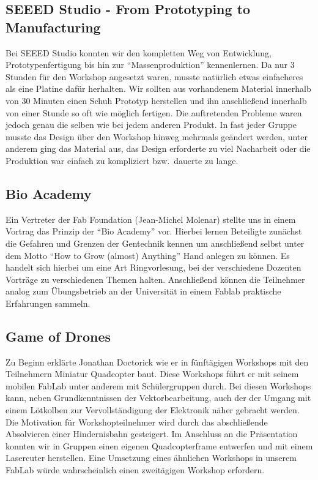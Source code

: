 \documentclass{\basedir/fablab-document}
\begin{document}
\subsection*{SEEED Studio - From Prototyping to Manufacturing}

Bei SEEED Studio konnten wir den kompletten Weg von Entwicklung,
Prototypenfertigung bis hin zur \enquote{Massenproduktion} kennenlernen. Da
nur 3 Stunden für den Workshop angesetzt waren, musste natürlich etwas
einfacheres als eine Platine dafür herhalten. Wir sollten aus
vorhandenem Material innerhalb von 30 Minuten einen Schuh Prototyp
herstellen und ihn anschließend innerhalb von einer Stunde so oft wie
möglich fertigen. Die auftretenden Probleme waren jedoch genau die selben
wie bei jedem anderen Produkt. In fast jeder Gruppe musste das Design
über den Workshop hinweg mehrmals geändert werden, unter anderem ging
das Material aus, das Design erforderte zu viel Nacharbeit oder die
Produktion war einfach zu kompliziert bzw.\ dauerte zu lange.

\subsection*{Bio Academy}

Ein Vertreter der Fab Foundation (Jean-Michel Molenar) stellte uns in
einem Vortrag das Prinzip der \enquote{Bio Academy} vor. Hierbei lernen
Beteiligte zunächst die Gefahren und Grenzen der Gentechnik kennen um
anschließend selbst unter dem Motto \enquote{How to Grow (almost) Anything}
Hand anlegen zu können. Es handelt sich hierbei um eine Art
Ringvorlesung, bei der verschiedene Dozenten Vorträge zu verschiedenen
Themen halten. Anschließend können die Teilnehmer analog zum
Übungsbetrieb an der Universität in einem Fablab praktische Erfahrungen
sammeln.

\subsection*{Game of Drones}

Zu Beginn erklärte Jonathan Doctorick wie er in fünftägigen Workshops
mit den Teilnehmern Miniatur Quadcopter baut. Diese Workshops führt er
mit seinem mobilen FabLab unter anderem mit Schülergruppen durch. Bei
diesen Workshops kann, neben Grundkenntnissen der Vektorbearbeitung,
auch der der Umgang mit einem Lötkolben zur Vervollständigung der
Elektronik näher gebracht werden. Die Motivation für Workshopteilnehmer
wird durch das abschließende Absolvieren einer Hindernisbahn gesteigert.
Im Anschluss an die Präsentation konnten wir in Gruppen einen eigenen
Quadcopterframe entwerfen und mit einem Lasercuter herstellen. Eine
Umsetzung eines ähnlichen Workshops in unserem FabLab würde
wahrscheinlich einen zweitägigen Workshop erfordern.
\end{document}
